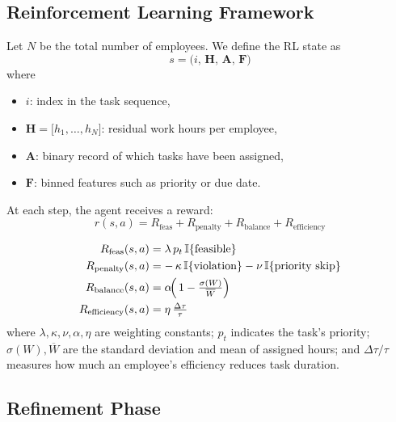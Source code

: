 \documentclass[%
aip,
cp,  %
amsmath,amssymb,
reprint,%
]{revtex4-2}
\begin{document}
	\subsection{\label{subsec:rl-framework}Reinforcement Learning Framework}
	
	Let $N$ be the total number of employees. We define the RL state as 
	\begin{equation}
		s = \bigl(i,\,\mathbf{H},\,\mathbf{A},\,\mathbf{F}\bigr)
	\end{equation}
	where 
	\begin{itemize}
		\item $i$: index in the task sequence, 
		\item $\mathbf{H} = \bigl[h_{1}, \dots, h_{N}\bigr]$: residual work hours per employee, 
		\item $\mathbf{A}$: binary record of which tasks have been assigned, 
		\item $\mathbf{F}$: binned features such as priority or due date.
	\end{itemize}
	
	At each step, the agent receives a reward:
	\begin{equation}
		r(s,a) = R_{\text{feas}} + R_{\text{penalty}} + R_{\text{balance}} + R_{\text{efficiency}}
	\end{equation}
	
	\begin{align}
		R_{\text{feas}}(s,a)       & = \lambda\,p_{t}\,\mathbb{I}\{\text{feasible}\}                                     \\
		R_{\text{penalty}}(s,a)    & = -\,\kappa\,\mathbb{I}\{\text{violation}\}-\nu\,\mathbb{I}\{\text{priority skip}\} \\
		R_{\text{balance}}(s,a)    & = \alpha\!\Bigl(\,1-\tfrac{\sigma(W)}{\overline{W}}\Bigr)                           \\
		R_{\text{efficiency}}(s,a) & = \eta\,\tfrac{\Delta\tau}{\tau}                                                    
	\end{align}
	where $\lambda,\kappa,\nu,\alpha,\eta$ are weighting constants; $p_{t}$ indicates the task's priority; $\sigma(W),\overline{W}$ are the standard deviation and mean of assigned hours; and $\Delta\tau/\tau$ measures how much an employee's efficiency reduces task duration.
	
	\subsection{\label{subsec:refinement}Refinement Phase}
	
\end{document}
